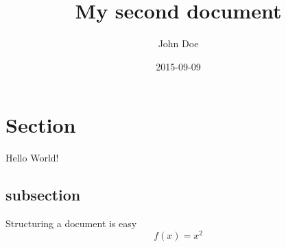 \documentclass{article}
\title{My second document}
\date{2015-09-09}
\author{John Doe}
\begin{document}
	\maketitle
	\newpage
	\section{Section}
	Hello World!
	\subsection{subsection}
	Structuring a document is easy
	\begin{equation*}
		f(x) = x^2
	\end{equation*}
\end{document}
